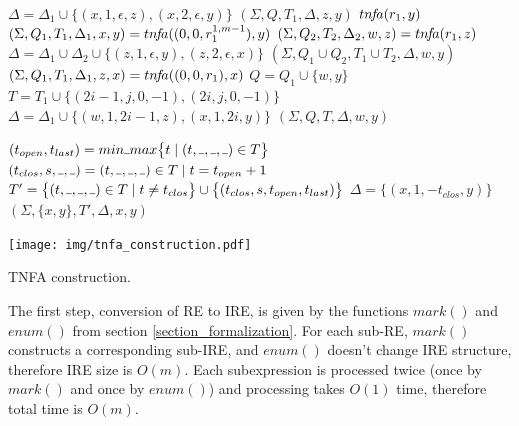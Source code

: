 \documentclass[AMA,STIX1COL]{WileyNJD-v2}
\let\oldnl\nl
\newcommand{\nonl}{\renewcommand{\nl}{\let\nl\oldnl}} %
\newcommand{\Xund}{\rule{.4em}{.4pt}}
\begin{document}
\begin{algorithm}[]
\begin{multicols}{2}
{{            $\Delta = \Delta_1 \cup \big\{ (x, 1, \epsilon, z), (x, 2, \epsilon, y) \big\}$ \;
            \Return $(\Sigma, Q, T_1, \Delta, z, y)$
        }
        \BlankLine
         {
            \Return $tn\!f\!a (r_1, y)$
        }
        \BlankLine
         {
            $(\Sigma, Q_1, T_1, \Delta_1, x, y) = tn\!f\!a ((0, 0, r_1^{1,m-1}), y)$ \;
            $(\Sigma, Q_2, T_2, \Delta_2, w, z) = tn\!f\!a (r_1, z)$ \;
            $\Delta = \Delta_1 \cup \Delta_2 \cup \big\{ (z, 1, \epsilon, y), (z, 2, \epsilon, x) \big\}$ \;
            \Return $(\Sigma, Q_1 \cup Q_2, T_1 \cup T_2, \Delta, w, y)$
        }
        \BlankLine
         {
            $(\Sigma, Q_1, T_1, \Delta_1, z, x) = tn\!f\!a ((0, 0, r_1), x)$ \;
            $Q = Q_1 \cup \{w, y\}$ \;
            $T = T_1 \cup \big\{ (2i\!-\!1, j, 0, -1), (2i, j, 0, -1) \big\}$ \;
            $\Delta = \Delta_1 \cup \big\{ (w, 1, 2i\!-\!1, z), (x, 1, 2i, y) \big\}$ \;
            \Return $(\Sigma, Q, T, \Delta, w, y)$
        }
    }
    \BlankLine
    \BlankLine

     {
        $(t_{open}, t_{last}) = min \Xund max \big\{ t \mid (t, \Xund, \Xund, \Xund) \in T \big\}$ \;
        $(t_{clos}, s, \Xund, \Xund) = (t, \Xund, \Xund, \Xund) \in T \mid t = t_{open} + 1$ \;
        $T' = \big\{ (t, \Xund, \Xund, \Xund) \in T \mid t \neq t_{clos} \big\} \cup \big\{ (t_{clos}, s, t_{open}, t_{last}) \big\}$ \;
        $\Delta = \big\{ (x, 1, -t_{clos}, y) \big\}$ \;
        \Return $(\Sigma, \{x, y\}, T', \Delta, x, y)$ \;
    }

    \vfill

\columnbreak

    \nonl \texttt{[image: img/tnfa\_construction.pdf]}

\end{multicols}
\vspace{0.5em}
\caption{TNFA construction.}\label{alg_tnfa}
\end{algorithm}

The first step, conversion of RE to IRE, is given by the functions $mark()$ and $enum()$ from section \ref{section_formalization}.
%
For each sub-RE, $mark()$ constructs a corresponding sub-IRE,
and $enum()$ doesn't change IRE structure,
therefore IRE size is $O(m)$.
%
Each subexpression is processed twice (once by $mark()$ and once by $enum()$)
and processing takes $O(1)$ time, therefore total time is $O(m)$.
\\
\end{document}
